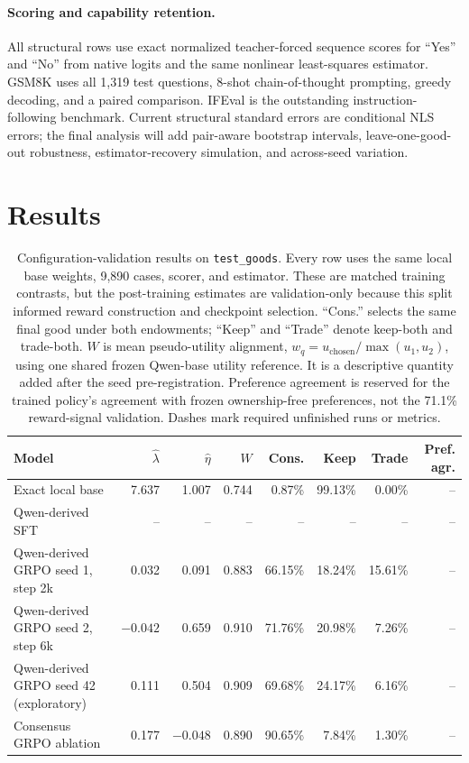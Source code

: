 \documentclass[letterpaper]{article} %
\begin{document}
\paragraph{Scoring and capability retention.}
All structural rows use exact normalized teacher-forced sequence scores for
``Yes'' and ``No'' from native logits and the same nonlinear least-squares
estimator. GSM8K \citep{cobbe2021gsm8k} uses all 1,319 test questions, 8-shot
chain-of-thought prompting, greedy decoding, and a paired comparison. IFEval
\citep{zhou2023ifeval} is the outstanding instruction-following benchmark.
Current structural standard errors are conditional NLS errors; the final
analysis will add pair-aware bootstrap intervals, leave-one-good-out
robustness, estimator-recovery simulation, and across-seed variation.

\section{Results}

\begin{table}[t]
\centering
\small
\begin{tabular}{lrrrrrrr}
\toprule
Model & $\widehat\lambda$ & $\widehat\eta$ & $W$ & Cons. & Keep & Trade & Pref. agr. \\
\midrule
Exact local base & 7.637 & 1.007 & 0.744 & 0.87\% & 99.13\% & 0.00\% & -- \\
Qwen-derived SFT & -- & -- & -- & -- & -- & -- & -- \\
Qwen-derived GRPO seed 1, step 2k & 0.032 & 0.091 & 0.883 & 66.15\% & 18.24\% & 15.61\% & -- \\
Qwen-derived GRPO seed 2, step 6k & $-0.042$ & 0.659 & 0.910 & 71.76\% & 20.98\% & 7.26\% & -- \\
Qwen-derived GRPO seed 42 (exploratory) & 0.111 & 0.504 & 0.909 & 69.68\% & 24.17\% & 6.16\% & -- \\
Consensus GRPO ablation & 0.177 & $-0.048$ & 0.890 & 90.65\% & 7.84\% & 1.30\% & -- \\
\bottomrule
\end{tabular}
\caption{Configuration-validation results on \texttt{test\_goods}. Every row
uses the same local base weights, 9,890 cases, scorer, and estimator. These are
matched training contrasts, but the post-training estimates are
validation-only because this split informed reward construction and checkpoint
selection. ``Cons.'' selects the same final good under both endowments;
``Keep'' and ``Trade'' denote keep-both and trade-both. $W$ is mean
pseudo-utility alignment,
$w_q=u_{\mathrm{chosen}}/\max(u_1,u_2)$, using one shared frozen Qwen-base
utility reference. It is a descriptive quantity added after the seed
pre-registration. Preference agreement is reserved for the trained policy's
agreement with frozen ownership-free preferences, not the 71.1\% reward-signal
validation. Dashes mark required unfinished runs or metrics.}
\label{tab:id-main}
\end{table}
\end{document}
